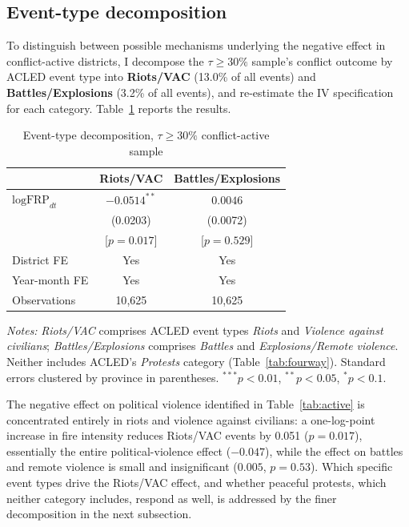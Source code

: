 \documentclass[12pt]{article}
\begin{document}
\subsection{Event-type decomposition}
\label{sec:eventtype}

To distinguish between possible mechanisms underlying the negative effect in conflict-active districts, I decompose the $\tau \geq 30\%$ sample's conflict outcome by ACLED event type into \textbf{Riots/VAC} (13.0\% of all events) and \textbf{Battles/Explosions} (3.2\% of all events), and re-estimate the IV specification for each category. Table~\ref{tab:eventtype} reports the results.

\begin{table}[H]
\centering
\caption{Event-type decomposition, $\tau \geq 30\%$ conflict-active sample}
\label{tab:eventtype}
\begin{tabular}{lcc}
\toprule
 & Riots/VAC & Battles/Explosions \\
\midrule
$\text{logFRP}_{dt}$ & $-0.0514^{**}$ & $0.0046$ \\
                     & (0.0203) & (0.0072) \\
                     & [$p=0.017$] & [$p=0.529$] \\
\midrule
District FE     & Yes & Yes \\
Year-month FE   & Yes & Yes \\
Observations     & 10{,}625 & 10{,}625 \\
\bottomrule
\end{tabular}
\begin{minipage}{0.85\textwidth}
\vspace{4pt}
\footnotesize \emph{Notes:} \emph{Riots/VAC} comprises ACLED event types \emph{Riots} and \emph{Violence against civilians}; \emph{Battles/Explosions} comprises \emph{Battles} and \emph{Explosions/Remote violence}. Neither includes ACLED's \emph{Protests} category (Table~\ref{tab:fourway}). Standard errors clustered by province in parentheses. $^{***}p<0.01$, $^{**}p<0.05$, $^{*}p<0.1$.
\end{minipage}
\end{table}

The negative effect on political violence identified in Table~\ref{tab:active} is concentrated entirely in riots and violence against civilians: a one-log-point increase in fire intensity reduces Riots/VAC events by 0.051 ($p=0.017$), essentially the entire political-violence effect ($-0.047$), while the effect on battles and remote violence is small and insignificant ($0.005$, $p=0.53$). Which specific event types drive the Riots/VAC effect, and whether peaceful protests, which neither category includes, respond as well, is addressed by the finer decomposition in the next subsection.
\end{document}

